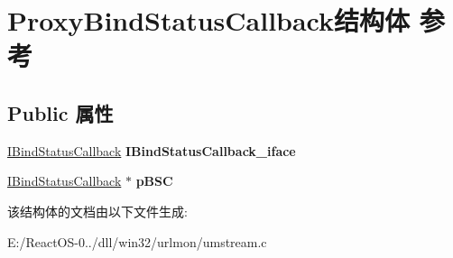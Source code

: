 \hypertarget{struct_proxy_bind_status_callback}{}\section{Proxy\+Bind\+Status\+Callback结构体 参考}
\label{struct_proxy_bind_status_callback}
\subsection*{Public 属性}
\begin{DoxyCompactItemize}
\item 
\mbox{\label{struct_proxy_bind_status_callback_a4588267ba254e1ff26a71f01a27e7595}} 
\hyperlink{interface_i_bind_status_callback}{I\+Bind\+Status\+Callback} {\bfseries I\+Bind\+Status\+Callback\+\_\+iface}
\item 
\mbox{\label{struct_proxy_bind_status_callback_a6353301e056df164d22e1a0732498346}} 
\hyperlink{interface_i_bind_status_callback}{I\+Bind\+Status\+Callback} $\ast$ {\bfseries p\+B\+SC}
\end{DoxyCompactItemize}


该结构体的文档由以下文件生成\+:\begin{DoxyCompactItemize}
\item 
E\+:/\+React\+O\+S-\/0../dll/win32/urlmon/umstream.\+c\end{DoxyCompactItemize}
